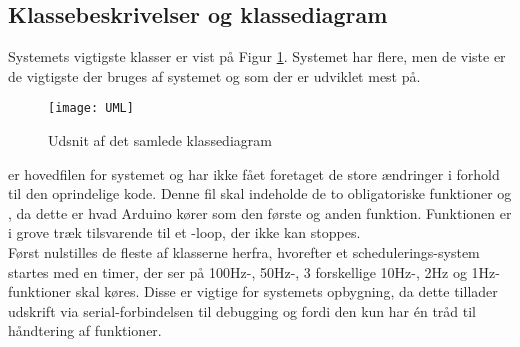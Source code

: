 \documentclass[Main]{subfiles}
\begin{document}
\subsection{Klassebeskrivelser og klassediagram}
Systemets vigtigste klasser er vist på Figur \ref{Fig:UML}.
Systemet har flere, men de viste er de vigtigste der bruges af systemet og som der er udviklet mest på.


\begin{figure}[H]
\centering
\texttt{[image: UML]}
\caption{Udsnit af det samlede klassediagram}
\label{Fig:UML}
\end{figure}

 er hovedfilen for systemet og har ikke fået foretaget de store ændringer i forhold til den oprindelige kode.
Denne fil skal indeholde de to obligatoriske funktioner  og , da dette er hvad Arduino kører som den første og anden funktion.
Funktionen  er i grove træk tilsvarende til et -loop, der ikke kan stoppes.
\\
Først nulstilles de fleste af klasserne herfra, hvorefter et schedulerings-system startes med en timer, der ser på 100Hz-, 50Hz-, 3 forskellige 10Hz-, 2Hz og 1Hz-funktioner skal køres. 
Disse er vigtige for systemets opbygning, da dette tillader udskrift via serial-forbindelsen til debugging og fordi den kun har én tråd til håndtering af funktioner.

\begin{Function}
\end{Function}


\begin{Function}
\end{Function}


\begin{Function}
\end{Function}
\end{document}
